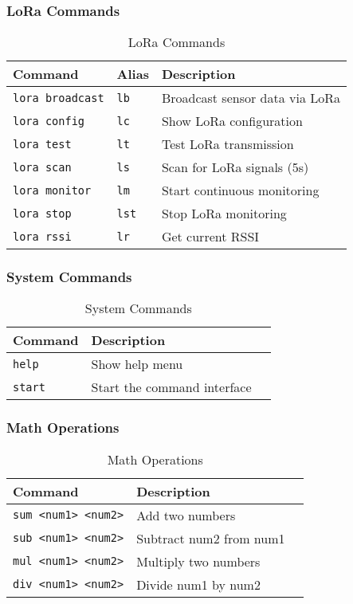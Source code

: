 \documentclass[11pt,a4paper]{article}
\begin{document}
\subsubsection{LoRa Commands}
\begin{table}[h]
\centering
\begin{tabular}{|l|l|l|}
\hline
\textbf{Command} & \textbf{Alias} & \textbf{Description} \\
\hline
\texttt{lora broadcast} & \texttt{lb} & Broadcast sensor data via LoRa \\
\hline
\texttt{lora config} & \texttt{lc} & Show LoRa configuration \\
\hline
\texttt{lora test} & \texttt{lt} & Test LoRa transmission \\
\hline
\texttt{lora scan} & \texttt{ls} & Scan for LoRa signals (5s) \\
\hline
\texttt{lora monitor} & \texttt{lm} & Start continuous monitoring \\
\hline
\texttt{lora stop} & \texttt{lst} & Stop LoRa monitoring \\
\hline
\texttt{lora rssi} & \texttt{lr} & Get current RSSI \\
\hline
\end{tabular}
\caption{LoRa Commands}
\end{table}

\subsubsection{System Commands}
\begin{table}[h]
\centering
\begin{tabular}{|l|l|l|}
\hline
\textbf{Command} & \textbf{Description} \\
\hline
\texttt{help} & Show help menu \\
\hline
\texttt{start} & Start the command interface \\
\hline
\end{tabular}
\caption{System Commands}
\end{table}

\subsubsection{Math Operations}
\begin{table}[h]
\centering
\begin{tabular}{|l|l|l|}
\hline
\textbf{Command} & \textbf{Description} \\
\hline
\texttt{sum <num1> <num2>} & Add two numbers \\
\hline
\texttt{sub <num1> <num2>} & Subtract num2 from num1 \\
\hline
\texttt{mul <num1> <num2>} & Multiply two numbers \\
\hline
\texttt{div <num1> <num2>} & Divide num1 by num2 \\
\hline
\end{tabular}
\caption{Math Operations}
\end{table}
\end{document}
